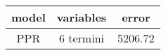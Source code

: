 \begin{table}[tb]
\centering
\begin{tabular}{| c | c | c }
  \hline
model & variables & error \\ 
  \hline
PPR & 6  termini & 5206.72 \\ 
   \hline
\end{tabular}
\caption{} 
\label{}
\end{table}
